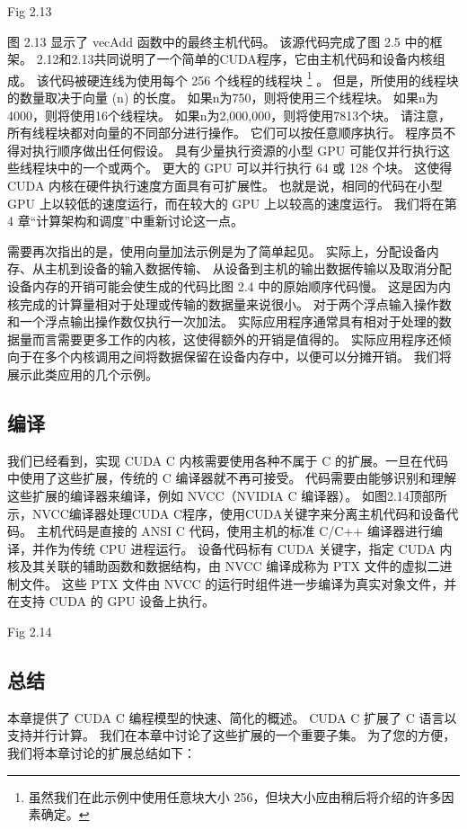 {\color{red} Fig 2.13}

图 2.13 显示了 vecAdd 函数中的最终主机代码。 该源代码完成了图 2.5 中的框架。 
2.12和2.13共同说明了一个简单的CUDA程序，它由主机代码和设备内核组成。 该代码被硬连线为使用每个 256 个线程的线程块
\footnote{虽然我们在此示例中使用任意块大小 256，但块大小应由稍后将介绍的许多因素确定。} 。 
但是，所使用的线程块的数量取决于向量 (n) 的长度。 如果n为750，则将使用三个线程块。 如果n为4000，则将使用16个线程块。 
如果n为2,000,000，则将使用7813个块。 请注意，所有线程块都对向量的不同部分进行操作。 
它们可以按任意顺序执行。 程序员不得对执行顺序做出任何假设。 
具有少量执行资源的小型 GPU 可能仅并行执行这些线程块中的一个或两个。 更大的 GPU 可以并行执行 64 或 128 个块。 
这使得 CUDA 内核在硬件执行速度方面具有可扩展性。 
也就是说，相同的代码在小型 GPU 上以较低的速度运行，而在较大的 GPU 上以较高的速度运行。 
我们将在第 4 章“计算架构和调度”中重新讨论这一点。

需要再次指出的是，使用向量加法示例是为了简单起见。 
实际上，分配设备内存、从主机到设备的输入数据传输、
从设备到主机的输出数据传输以及取消分配设备内存的开销可能会使生成的代码比图 2.4 中的原始顺序代码慢。 
这是因为内核完成的计算量相对于处理或传输的数据量来说很小。 对于两个浮点输入操作数和一个浮点输出操作数仅执行一次加法。 
实际应用程序通常具有相对于处理的数据量而言需要更多工作的内核，这使得额外的开销是值得的。 
实际应用程序还倾向于在多个内核调用之间将数据保留在设备内存中，以便可以分摊开销。 我们将展示此类应用的几个示例。

\subsection{编译}
我们已经看到，实现 CUDA C 内核需要使用各种不属于 C 的扩展。一旦在代码中使用了这些扩展，传统的 C 编译器就不再可接受。 
代码需要由能够识别和理解这些扩展的编译器来编译，例如 NVCC（NVIDIA C 编译器）。 
如图2.14顶部所示，NVCC编译器处理CUDA C程序，使用CUDA关键字来分离主机代码和设备代码。 
主机代码是直接的 ANSI C 代码，使用主机的标准 C/C++ 编译器进行编译，并作为传统 CPU 进程运行。 
设备代码标有 CUDA 关键字，指定 CUDA 内核及其关联的辅助函数和数据结构，由 NVCC 编译成称为 PTX 文件的虚拟二进制文件。 
这些 PTX 文件由 NVCC 的运行时组件进一步编译为真实对象文件，并在支持 CUDA 的 GPU 设备上执行。

{\color{red} Fig 2.14}

\subsection{总结}
本章提供了 CUDA C 编程模型的快速、简化的概述。 CUDA C 扩展了 C 语言以支持并行计算。 
我们在本章中讨论了这些扩展的一个重要子集。 为了您的方便，我们将本章讨论的扩展总结如下：


